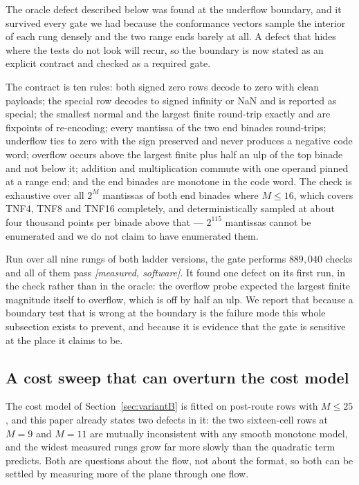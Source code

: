 \documentclass[11pt]{article}
\theoremstyle{definition}
\begin{document}
The oracle defect described below was found at the underflow boundary, and it
survived every gate we had because the conformance vectors sample the interior of
each rung densely and the two range ends barely at all. A defect that hides where
the tests do not look will recur, so the boundary is now stated as an explicit
contract and checked as a required gate.

The contract is ten rules: both signed zero rows decode to zero with clean
payloads; the special row decodes to signed infinity or NaN and is reported as
special; the smallest normal and the largest finite round-trip exactly and are
fixpoints of re-encoding; every mantissa of the two end binades round-trips;
underflow ties to zero with the sign preserved and never produces a negative code
word; overflow occurs above the largest finite plus half an ulp of the top binade
and not below it; addition and multiplication commute with one operand pinned at a
range end; and the end binades are monotone in the code word. The check is
exhaustive over all $2^M$ mantissas of both end binades where $M \le 16$, which
covers TNF4, TNF8 and TNF16 completely, and deterministically sampled at about
four thousand points per binade above that --- $2^{115}$ mantissas cannot be
enumerated and we do not claim to have enumerated them.

Run over all nine rungs of both ladder versions, the gate performs $889{,}040$
checks and all of them pass \emph{[measured, software]}. It found one defect on
its first run, in the check rather than in the oracle: the overflow probe expected
the largest finite magnitude itself to overflow, which is off by half an ulp. We
report that because a boundary test that is wrong at the boundary is the failure
mode this whole subsection exists to prevent, and because it is evidence that the
gate is sensitive at the place it claims to be.

\subsection{A cost sweep that can overturn the cost model}
\label{sec:costsweep}

The cost model of Section~\ref{sec:variantB} is fitted on post-route rows with
$M \le 25$, and this paper already states two defects in it: the two sixteen-cell
rows at $M = 9$ and $M = 11$ are mutually inconsistent with any smooth monotone
model, and the widest measured rungs grow far more slowly than the quadratic term
predicts. Both are questions about the flow, not about the format, so both can be
settled by measuring more of the plane through one flow.
\end{document}
